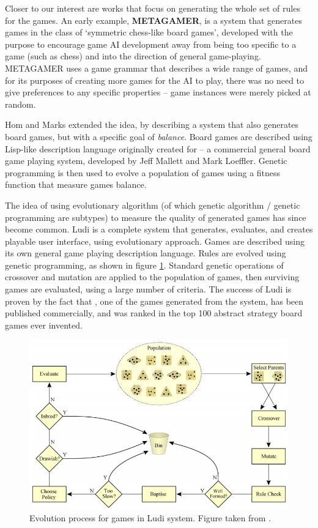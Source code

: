 Closer to our interest are works that focus on generating the whole set of rules for the games. An early example, \textbf{METAGAMER}\cite{pell1992metagame}, is a system that generates games in the class of `symmetric chess-like board games', developed  with the purpose to encourage game AI development away from being too specific to a game (such as chess) and into the direction of general game-playing. METAGAMER uses a game grammar that describes a wide range of games, and for its purposes of creating more games for the AI to play, there was no need to give preferences to any specific properties -- game instances were merely picked at random.
	
Hom and Marks\cite{hom2007automatic} extended the idea, by describing a system that also generates board games, but with a specific goal of \textit{balance}. Board games are described using Lisp-like description language originally created for  -- a commercial general board game playing system, developed by Jeff Mallett and Mark Loeffler.\cite{levy2005robots} Genetic programming is then used to evolve a population of games using a fitness function that measure games balance.

The idea of using evolutionary algorithm (of which genetic algorithm / genetic programming are subtypes) to measure the quality of generated games has since become common. Ludi\cite{browne2010evolutionary} is a complete system that generates, evaluates, and creates playable user interface, using evolutionary approach. Games are described using its own general game playing description language. Rules are evolved using genetic programming, as shown in figure \ref{fig:ludi}. Standard genetic operations of crossover and mutation are applied to the population of games, then surviving games are evaluated, using a large number of criteria. The success of Ludi is proven by the fact that , one of the games generated from the system, has been published commercially, and was ranked in the top 100 abstract strategy board games ever invented.\cite{browne2011yavalath}

\begin{figure}
	\centering
	\includegraphics[width=.8\linewidth]{figures/ludi}
	\caption{Evolution process for games in Ludi system. Figure taken from \cite{browne2010evolutionary}.}
	\label{fig:ludi}
\end{figure}

